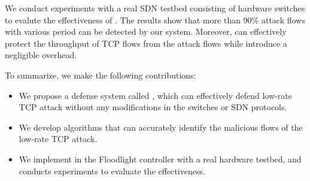 We conduct experiments with a real SDN testbed consisting of hardware switches to evalute the effectiveness of \TheName{}. The results show that 
more than 90\% attack flows with various period can be detected by our system. Moreover, \TheName{} can effectively protect the throughput of TCP flows from the attack flows while introduce a negligible overhead.

To summarize, we make the following contributions:

\begin{itemize}

\item We propose a defense system called \TheName{}, which can effectively defend low-rate TCP attack without any modifications in the switches or SDN protocols.  
\item We develop algorithms that can accurately identify the malicious flows of the low-rate TCP attack.
\item We implement \TheName{} in the Floodlight controller with a real hardware testbed, and conducts experiments to evaluate the effectiveness.

\end{itemize}
